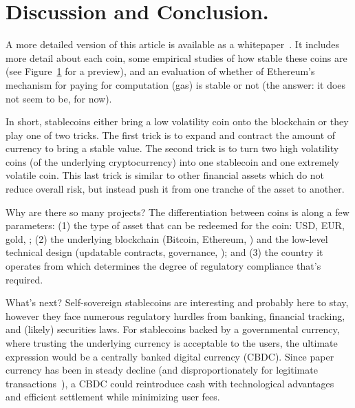 
\section{Discussion and Conclusion.}

A more detailed version of this article is available as a whitepaper~\cite{CDM19}. It includes more detail about each coin, some empirical studies of how stable these coins are (see Figure~\ref{} for a preview), and an evaluation of whether of Ethereum's mechanism for paying for computation (gas) is stable or not (the answer: it does not seem to be, for now).

In short, stablecoins either bring a low volatility coin onto the blockchain or they play one of two tricks. The first trick is to expand and contract the amount of currency to bring a stable value. The second trick is to turn two high volatility coins (\eg of the underlying cryptocurrency) into one stablecoin and one extremely volatile coin. This last trick is similar to other financial assets which do not reduce overall risk, but instead push it from one tranche of the asset to another.

Why are there so many projects? The differentiation between coins is along a few parameters: (1) the type of asset that can be redeemed for the coin: USD, EUR, gold, \etc; (2) the underlying blockchain (\eg Bitcoin, Ethereum, \etc) and the low-level technical design (updatable contracts, governance, \etc); and (3) the country it operates from which determines the degree of regulatory compliance that's required. 

What's next? Self-sovereign stablecoins are interesting and probably here to stay, however they face numerous regulatory hurdles from banking, financial tracking, and (likely) securities laws. For stablecoins backed by a governmental currency, where trusting the underlying currency is acceptable to the users, the ultimate expression would be a centrally banked digital currency (CBDC). Since paper currency has been in steady decline (and disproportionately for legitimate transactions~\cite{rogoff2017curse}), a CBDC could reintroduce cash with technological advantages and efficient settlement while minimizing user fees.

